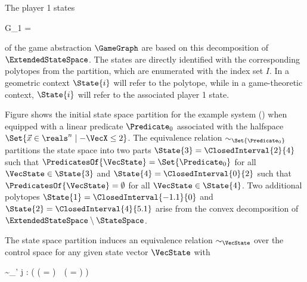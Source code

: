     The player 1 states

    \startformula
        G_1 = 
    \stopformula

    of the game abstraction $\GameGraph$ are based on this decomposition of $\ExtendedStateSpace$.
    The states are directly identified with the corresponding polytopes from the partition, which are enumerated with the index set $I$.
    In a geometric context $\State{i}$ will refer to the polytope, while in a game-theoretic context, $\State{i}$ will refer to the associated player 1 state.


    Figure  shows the initial state space partition for the example system () when equipped with a linear predicate $\Predicate_0$ associated with the halfspace $ \Set{ \Vec{x} \in \reals^n \mid -\VecX \leq 2 } $.
    The equivalence relation $\sim_{\Set{\Predicate_0}}$ partitions the state space into two parts $\State{3} = \ClosedInterval{2}{4}$ such that $\PredicatesOf{\VecState} = \Set{\Predicate_0}$ for all $\VecState \in \State{3}$ and $\State{4} = \ClosedInterval{0}{2}$ such that $\PredicatesOf{\VecState} = \emptyset$ for all $\VecState \in \State{4}$.
    Two additional polytopes $\State{1} = \ClosedInterval{-1.1}{0}$ and $\State{2} = \ClosedInterval{4}{5.1}$ arise from the convex decomposition of $\ExtendedStateSpace \setminus \StateSpace$.

    The state space partition induces an equivalence relation $\sim_\VecState$ over the control space for any given state vector $\VecState$ with

    \startformula
        \VecControl \sim_\VecState \VecControl' \;\Longleftrightarrow\;
        \forall j \in \StateIndices: \Big(
            ( \Posterior{\VecState}{\VecControl} \cap {} = \emptyset ) \,\leftrightarrow\,
            (  \cap {} = \emptyset )
        \Big) \EndComma
    \stopformula

